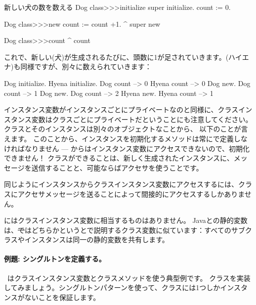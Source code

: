 \documentclass[a4paper,10pt,twoside]{book}
\begin{document}
\begin{method}[dogcount]{新しい犬の数を数える}
Dog class>>>initialize
	super initialize.
	count := 0.

Dog class>>>new
	count := count +1.
	^ super new

Dog class>>>count
	^ count
\end{method}

これで、新しい(犬)が生成されるたびに、頭数に1が足されていきます。(ハイエナ)も同様ですが、別々に数えられていきます：
\begin{code}{}
Dog initialize.
Hyena initialize.
Dog count     --> 0
Hyena count --> 0
Dog new.
Dog count     --> 1
Dog new.
Dog count     --> 2
Hyena new.
Hyena count --> 1
\end{code}

インスタンス変数がインスタンスごとにプライベートなのと同様に、クラスインスタンス変数はクラスごとにプライベートだということにも注意してください。
クラスとそのインスタンスは別々のオブジェクトなことから、
以下のことが言えます。
このことから、インスタンスを初期化するメソッドは常にで定義しなければなりません --- からはインスタンス変数にアクセスできないので、初期化できません！
クラスができることは、新しく生成されたインスタンスに、メッセージを送信することと、可能ならばアクセサを使うことです。

同じようにインスタンスからクラスインスタンス変数にアクセスするには、クラスにアクセサメッセージを送ることによって間接的にアクセスするしかありません。

にはクラスインスタンス変数に相当するものはありません。
Javaとの静的変数は、\st ではどちらかというとで説明するクラス変数に似ています：すべてのサブクラスやインスタンスは同一の静的変数を共有します。

\paragraph{例題: シングルトンを定義する。}
~\cite{Alpe98a}はクラスインスタンス変数とクラスメソッドを使う典型例です。
クラスを実装してみましょう。シングルトンパターンを使って、クラスには1つしかインスタンスがないことを保証します。
\end{document}
